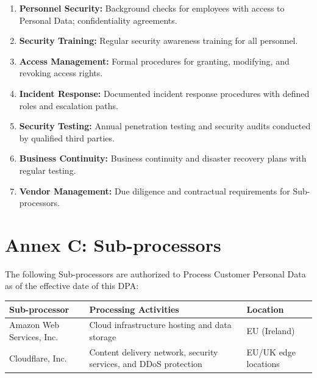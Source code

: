 \documentclass[11pt,a4paper]{article}
\begin{document}
\begin{enumerate}
    \item \textbf{Personnel Security:} Background checks for employees with access to Personal Data; confidentiality agreements.
    
    \item \textbf{Security Training:} Regular security awareness training for all personnel.
    
    \item \textbf{Access Management:} Formal procedures for granting, modifying, and revoking access rights.
    
    \item \textbf{Incident Response:} Documented incident response procedures with defined roles and escalation paths.
    
    \item \textbf{Security Testing:} Annual penetration testing and security audits conducted by qualified third parties.
    
    \item \textbf{Business Continuity:} Business continuity and disaster recovery plans with regular testing.
    
    \item \textbf{Vendor Management:} Due diligence and contractual requirements for Sub-processors.
\end{enumerate}

\newpage
\section*{Annex C: Sub-processors}

The following Sub-processors are authorized to Process Customer Personal Data as of the effective date of this DPA:

\begin{center}
\begin{tabular}{@{}>{\raggedright}p{4cm}>{\raggedright}p{5cm}>{\raggedright\arraybackslash}p{4cm}@{}}
\toprule
\textbf{Sub-processor} & \textbf{Processing Activities} & \textbf{Location} \\
\midrule
Amazon Web Services, Inc. & Cloud infrastructure hosting and data storage & EU (Ireland) \\
\midrule
Cloudflare, Inc. & Content delivery network, security services, and DDoS protection & EU/UK edge locations \\
\bottomrule
\end{tabular}
\end{center}
\end{document}
